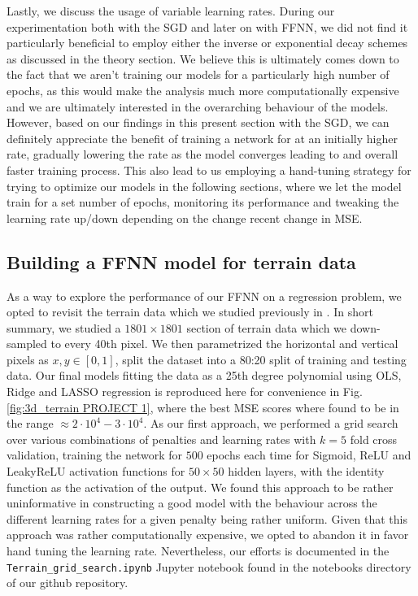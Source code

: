 \documentclass[reprint, english, nofootinbib]{revtex4-2}
\begin{document}
Lastly, we discuss the usage of variable learning rates. During our experimentation both with the SGD and later on with FFNN, we did not find it particularly beneficial to employ either the inverse or exponential decay schemes as discussed in the theory section. We believe this is ultimately comes down to the fact that we aren't training our models for a particularly high number of epochs, as this would make the analysis much more computationally expensive and we are ultimately interested in the overarching behaviour of the models. However, based on our findings in this present section with the SGD, we can definitely appreciate the benefit of training a network for at an initially higher rate, gradually lowering the rate as the model converges leading to and overall faster training process. This also lead to us employing a hand-tuning strategy for trying to optimize our models in the following sections, where we let the model train for a set number of epochs, monitoring its performance and tweaking the learning rate up/down depending on the change recent change in MSE.

\subsection{Building a FFNN model for terrain data}
\noindent
As a way to explore the performance of our FFNN on a regression problem, we opted to revisit the terrain data which we studied previously in \cite{4155_project_1}. In short summary, we studied a $1801\times1801$ section of terrain data which we down-sampled to every 40th pixel. We then parametrized the horizontal and vertical pixels as $x, y \in [0, 1]$, split the dataset into a 80:20 split of training and testing data. Our final models fitting the data as a 25th degree polynomial using OLS, Ridge and LASSO regression is reproduced here for convenience in Fig.\ref{fig:3d_terrain PROJECT 1}, where the best MSE scores where found to be in the range $\approx 2 \cdot 10^{4} - 3 \cdot 10^{4}$.
As our first approach, we performed a grid search over various combinations of penalties and learning rates with $k=5$ fold cross validation, training the network for $500$ epochs each time for Sigmoid, ReLU and LeakyReLU activation functions for $50\times50$ hidden layers, with the identity function as the activation of the output. We found this approach to be rather uninformative in constructing a good model with the behaviour across the different learning rates for a given penalty being rather uniform. Given that this approach was rather computationally expensive, we opted to abandon it in favor hand tuning the learning rate. Nevertheless, our efforts is documented in the \lstinline{Terrain_grid_search.ipynb} Jupyter notebook found in the notebooks directory of our github repository.
\end{document}

